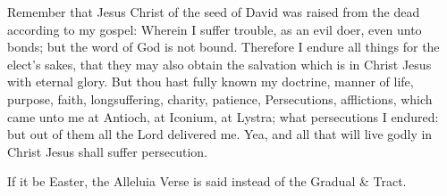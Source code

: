  Remember that Jesus Christ of the seed of David was raised from the dead according to my gospel: Wherein I suffer trouble, as an evil doer, even unto bonds; but the word of God is not bound. Therefore I endure all things for the elect's sakes, that they may also obtain the salvation which is in Christ Jesus with eternal glory. But thou hast fully known my doctrine, manner of life, purpose, faith, longsuffering, charity, patience, Persecutions, afflictions, which came unto me at Antioch, at Iconium, at Lystra; what persecutions I endured: but out of them all the Lord delivered me. Yea, and all that will live godly in Christ Jesus shall suffer persecution.



\begin{rubric}
    If it be Easter, the Alleluia Verse is said instead of the Gradual \& Tract.
\end{rubric}


